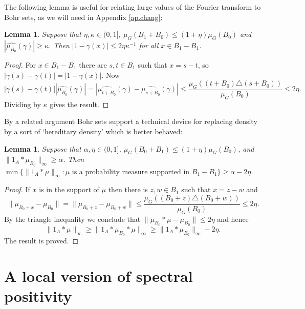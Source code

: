 \documentclass[12pt,reqno]{amsart}
\newtheorem{lemma}[subsection]{Lemma}
\providecommand{\wh}{\widehat}
\numberwithin{equation}{section}
\begin{document}
The following lemma is useful for relating large values of the Fourier transform to Bohr sets, as we will need in Appendix \ref{ap.chang}:
\begin{lemma}\label{lem.inv}
Suppose that $\eta,\kappa \in (0,1]$, $\mu_G(B_1+{B_0}) \leq (1+\eta)\mu_G({B_0})$ and $|\wh{\mu_{{B_0}}}(\gamma)| \geq \kappa$. Then $|1-\gamma(x)|\leq 2\eta\kappa^{-1}$ for all $x \in B_1-B_1$.
\end{lemma}
\begin{proof} For $x \in B_1-B_1$ there are $s,t \in B_1$ such that $x=s-t$, so $|\gamma(s)-\gamma(t)|=|1-\gamma(x)|$. Now
\begin{equation*}
|\gamma(s)-\gamma(t)||\wh{\mu_{B_0}}(\gamma)| = |\wh{\mu_{t+{B_0}}}(\gamma) - \wh{\mu_{s+{B_0}}}(\gamma)|  \leq \frac{\mu_G((t+{B_0}) \triangle (s+{B_0}))}{\mu_G({B_0})} \leq 2\eta.
\end{equation*}
Dividing by $\kappa$ gives the result.
\end{proof}
By a related argument Bohr sets support a technical device for replacing density by a sort of `hereditary density' which is better behaved:
\begin{lemma}\label{lem.large}
Suppose that $\alpha,\eta \in (0,1]$, $\mu_G(B_0+B_1) \leq (1+\eta)\mu_G(B_0)$, and $\|1_A \ast \mu_{B_0}\|_\infty \geq \alpha$. Then $\min{\{\|1_A \ast \mu\|_\infty : \mu \text{ is a probability measure supported in } B_1-B_1\}} \geq \alpha - 2\eta$.
\end{lemma}
\begin{proof}
If $x$ is in the support of $\mu$ then there is $z,w \in B_1$ such that $x=z-w$ and
\begin{equation*}
\|\mu_{B_0+x} - \mu_{B_0}\|=\|\mu_{B_0+z} - \mu_{B_0+w}\| \leq \frac{\mu_{G}( (B_0+z) \triangle (B_0+w))}{\mu_G(B_0)} \leq 2\eta.
\end{equation*}
By the triangle inequality we conclude that $\|\mu_{B_0} \ast \mu - \mu_{B_0}\|\leq 2\eta$ and hence
\begin{equation*}
\|1_A \ast \mu\|_\infty \geq \|1_A \ast \mu_{B_0}\ast \mu\|_\infty \geq \|1_A \ast \mu_{B_0}\|_\infty - 2\eta.
\end{equation*}
 The result is proved.
\end{proof}

\section{A local version of spectral positivity}\label{ap.specpos}
\end{document}
